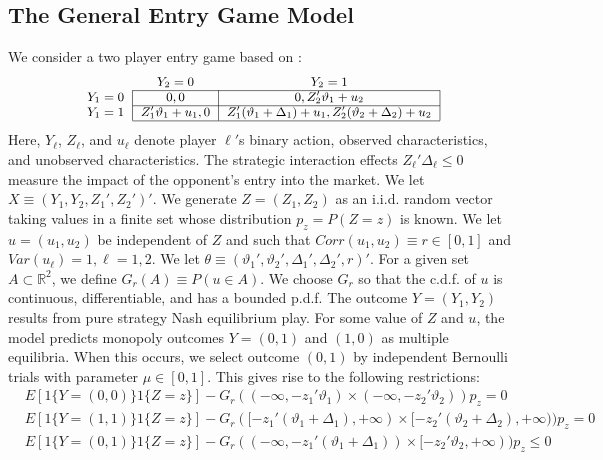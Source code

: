 \documentclass[letterpaper,11pt]{article}
\theoremstyle{myplain}
\theoremstyle{mydefinition}
\theoremstyle{myremark}
\renewcommand{\cite}{\citet}
\newcommand{\R}{\mathbb{R}}
\numberwithin{equation}{section}
\numberwithin{figure}{section}
\begin{document}
\begin{appendix}
\subsection{The General Entry Game Model}
\label{sec:entry}
We consider a two player entry game based on \cite{CilibertoTamer09}:
\begin{equation*}\small
\begin{tabular}{ccc}
& $Y_2=0$ & $Y_2=1$ \\ \cline{2-3}
$Y_1=0$ & \multicolumn{1}{|c}{$0,0$} & \multicolumn{1}{|c|}{$0,Z_2'\vartheta_1+u_{2}$} \\
\cline{2-3}
$Y_1=1$ & \multicolumn{1}{|c}{$Z_1'\vartheta_1+u_{1},0$} & \multicolumn{1}{|c|}{$Z_1'(\vartheta_1+\Delta_1)+u_{1},Z_2'(\vartheta_2+\Delta_2)+u_{2}$} \\ \cline{2-3}
\end{tabular}
\end{equation*}\normalsize
Here, $Y_\ell$, $Z_\ell$, and $u_\ell$ denote player $\ell'$s binary action, observed characteristics, and unobserved characteristics. The strategic interaction effects $Z_\ell'\Delta_\ell \le 0$ measure the impact of the opponent's entry into the market. We let $X\equiv(Y_1,Y_2,Z_1',Z_2')'$.
We generate $Z=(Z_1,Z_2)$ as an i.i.d. random vector taking values in a finite set whose distribution $p_z=P(Z=z)$ is known. We let $u=(u_1,u_2)$ be independent of $Z$ and such that $Corr(u_1,u_2)\equiv r\in[0,1]$ and $Var(u_\ell)=1,\ell=1,2$. We let $\theta\equiv(\vartheta_1',\vartheta_2',\Delta_1',\Delta_2',r)'.$ For a given set $A \subset \R^2$, we define $G_r(A)\equiv P(u\in A)$. We choose $G_r$ so that the c.d.f. of $u$ is continuous, differentiable, and has a bounded p.d.f.
The outcome $Y=(Y_1,Y_2)$ results from pure strategy Nash equilibrium play. For some value of $Z$ and $u$, the model predicts monopoly outcomes $Y=(0,1)$ and $(1,0)$ as multiple equilibria. When this occurs, we select outcome $(0,1)$ by independent Bernoulli trials with parameter $\mu\in[0,1]$. This gives rise to the following restrictions:
\begin{align}
	&E[1\{Y=(0,0)\}1\{Z=z\}]-G_r((-\infty,-z_1'\vartheta_1)\times(-\infty,-z_2'\vartheta_2))p_z=0 \label{eq:entry5}\\
	&E[1\{Y=(1,1)\}1\{Z=z\}]-G_r([-z_1'(\vartheta_1+\Delta_1),+\infty)\times [-z_2'(\vartheta_2+\Delta_2),+\infty))p_z=0\label{eq:entry6}\\
	&E[1\{Y=(0,1)\}1\{Z=z\}]-G_r((-\infty,-z_1'(\vartheta_1+\Delta_1))\times [-z_2'\vartheta_2,+\infty))p_z\le 0\label{eq:entry7}\\

\end{align}
\end{appendix}
\end{document}
